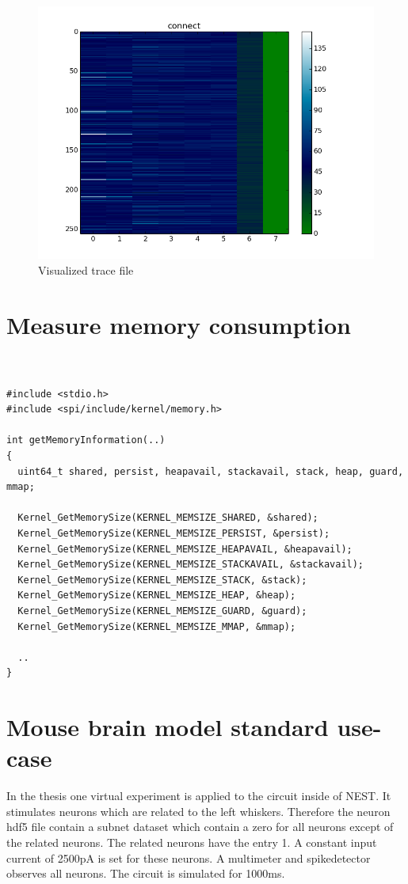 \begin{figure}[ht!]
\centering
\includegraphics[scale=0.4]{pictures/1per300_tracefile_connect.png}
\caption{Visualized trace file}
\end{figure}

\chapter{Measure memory consumption}

\begin{lstlisting}


#include <stdio.h>
#include <spi/include/kernel/memory.h>

int getMemoryInformation(..)
{
  uint64_t shared, persist, heapavail, stackavail, stack, heap, guard, mmap;

  Kernel_GetMemorySize(KERNEL_MEMSIZE_SHARED, &shared);
  Kernel_GetMemorySize(KERNEL_MEMSIZE_PERSIST, &persist);
  Kernel_GetMemorySize(KERNEL_MEMSIZE_HEAPAVAIL, &heapavail);
  Kernel_GetMemorySize(KERNEL_MEMSIZE_STACKAVAIL, &stackavail);
  Kernel_GetMemorySize(KERNEL_MEMSIZE_STACK, &stack);
  Kernel_GetMemorySize(KERNEL_MEMSIZE_HEAP, &heap);
  Kernel_GetMemorySize(KERNEL_MEMSIZE_GUARD, &guard);
  Kernel_GetMemorySize(KERNEL_MEMSIZE_MMAP, &mmap);

  ..
}

\end{lstlisting}

\chapter{Mouse brain model standard use-case}
\label{ambmusecase}
In the thesis one virtual experiment is applied to the circuit inside of NEST.
It stimulates neurons which are related to the left whiskers.
Therefore the neuron hdf5 file contain a subnet dataset which contain a zero
for all neurons except of the related neurons. The related neurons have the entry 1.
A constant input current of 2500pA is set for these neurons.
A multimeter and spikedetector observes all neurons.
The circuit is simulated for 1000ms.


